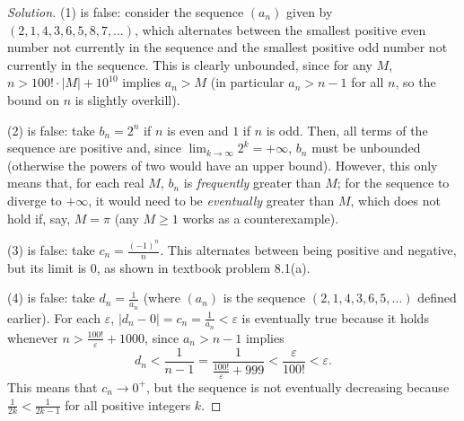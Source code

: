 \documentclass[11pt]{scrartcl}
\providecommand{\eps}{\varepsilon}
\theoremstyle{remark}
\newenvironment{soln}{\begin{proof}[Solution]}{\end{proof}}
\begin{document}
	\begin{soln}
		(1) is false: consider the sequence $(a_n)$ given by
		$(2, 1, 4, 3, 6, 5, 8, 7, \dots)$, which alternates between
		the smallest positive even number not currently in the sequence
		and the smallest positive odd number not currently in the sequence.
		This is clearly unbounded, since for any $M$, $n > 100!\cdot|M| + 10^{10}$
		implies $a_n > M$ (in particular $a_n > n - 1$ for all $n$,
		so the bound on $n$ is slightly overkill).
		
		(2) is false: take $b_n = 2^n$ if $n$ is even and $1$ if $n$ is odd.
		Then, all terms of the sequence are positive and, since
		$\lim_{k\to\infty} 2^k = +\infty$, $b_n$ must be unbounded (otherwise
		the powers of two would have an upper bound).
		However, this only means that, for each real $M$,
		$b_n$ is \emph{frequently} greater than $M$;
		for the sequence to diverge to $+\infty$, it would need to be
		\emph{eventually} greater than $M$, which does not hold if, say, $M = \pi$
		(any $M\ge 1$ works as a counterexample).
		
		(3) is false: take $c_n = \frac{(-1)^n}{n}$.
		This alternates between being positive and negative,
		but its limit is $0$, as shown in textbook problem 8.1(a).
		
		(4) is false: take $d_n = \frac 1{a_n}$
		(where $(a_n)$ is the sequence $(2, 1, 4, 3, 6, 5, \dots)$
		defined earlier). For each $\eps$, $|d_n - 0| = c_n = \frac{1}{a_n} < \eps$
		is eventually true because it holds whenever $n > \frac{100!}{\eps} + 1000$,
		since $a_n > n - 1$ implies
		\[d_n < \frac{1}{n - 1} = \frac{1}{\frac{100!}{\eps} + 999}
		< \frac{\eps}{100!} < \eps.\]
		This means that $c_n\to 0^+$, but the sequence is not eventually
		decreasing because
		$\frac{1}{2k} < \frac{1}{2k-1}$ for all positive integers $k$.
	\end{soln}
	
\end{document}
